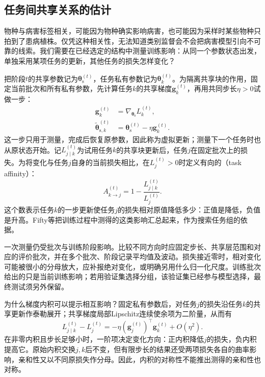 \subsection{任务间共享关系的估计}
\label{sec:ket-sharing-affinity}

物种与病害标签相关，可能因为物种确实影响病害，也可能因为采样时某些物种只拍到了患病植株。仅凭这种相关性，无法知道类别监督会不会把病害模型引向不可靠的线索。我们需要在已经选定的结构中测量训练影响：从同一个参数状态出发，单独采用某项任务的更新，其他任务的损失怎样变化？

把阶段$t$的共享参数记为$\bm{\theta}_{\mathrm{s}}^{(t)}$，任务私有参数记为$\bm{\theta}_k^{(t)}$。为隔离共享块的作用，固定当前批次和所有私有参数，先计算任务$k$的共享梯度$\bm g_k^{(t)}$，再用共同步长$\eta>0$试做一步：
\begin{align}
  \bm g_k^{(t)}
    &=\nabla_{\bm{\theta}_{\mathrm{s}}}L_k^{(t)},
  \\
  \widetilde{\bm{\theta}}_{\mathrm{s},k}^{(t)}
    &=\bm{\theta}_{\mathrm{s}}^{(t)}-\eta\bm g_k^{(t)}.
  \label{eq:ket-sharing-virtual-step}
\end{align}
这一步只用于测量，完成后恢复原参数，因此称为虚拟更新；测量下一个任务时也从原状态开始。记$L_{j\mid k}^{(t)}$为试用任务$k$的共享块更新后，任务$j$在固定批次上的损失。为将变化与任务$j$自身的当前损失相比，在$L_j^{(t)}>0$时定义有向的（task affinity）：
\begin{equation}
  A_{k\to j}^{(t)}
  =1-\frac{L_{j\mid k}^{(t)}}{L_j^{(t)}}.
  \label{eq:ket-sharing-affinity}
\end{equation}
这个数表示任务$k$的一步更新使任务$j$的损失相对原值降低多少：正值是降低，负值是升高。Fifty等把训练过程中测得的这类影响汇总起来，作为搜索任务组的依据。

一次测量仍受批次与训练阶段影响。比较不同方向时应固定步长、共享层范围和对应的评价批次，并在多个批次、阶段记录平均值及波动。损失接近零时，相对变化可能被很小的分母放大，应补报绝对变化，或明确另用什么归一化尺度。训练批次给出的只是当前训练影响；若用验证集选择分组，该验证集已经参与模型选择，最终测试须另外保留。

为什么梯度内积可以提示相互影响？固定私有参数后，对任务$j$的损失沿任务$k$的共享更新作泰勒展开；共享梯度局部Lipschitz连续使余项为二阶量，从而有
\begin{equation}
  L_{j\mid k}^{(t)}-L_j^{(t)}
  =-\eta(\bm g_j^{(t)})^{\top}\bm g_k^{(t)}
  +O(\eta^2).
  \label{eq:ket-sharing-local-effect}
\end{equation}
在非零内积且步长足够小时，一阶项决定变化方向：正内积降低$j$的损失，负内积提高它。原始内积交换$j,k$后不变，但有限步长的结果还受两项损失各自的曲率影响，亲和性又以不同原损失作分母。因此，内积的对称性不能推出测得的亲和性也对称。


